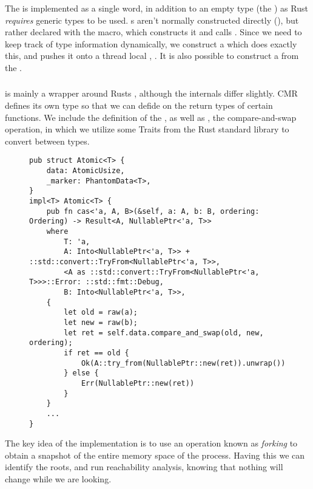 The  is implemented as a single word, in addition to an empty type (the
) as Rust \emph{requires} generic types to be used. s aren't normally
constructed directly (), but rather declared with the
 macro, which constructs it and calls . Since we need to keep
track of type information dynamically, we construct a  which does exactly this,
and pushes it onto a thread local , .
It is also possible to construct a  from the .

\subsubsection{}

 is mainly a wrapper around Rusts , although the internals differ
slightly. CMR defines its own type so that we can defide on the return types of certain functions.
We include the definition of the , as well as , the compare-and-swap
operation, in which we utilize some Traits from the Rust standard library to convert between types.

\begin{figure}[p]
  \begin{lstlisting}[caption=Excerpt of \mc{Atomic}s definitions]
pub struct Atomic<T> {
    data: AtomicUsize,
    _marker: PhantomData<T>,
}
impl<T> Atomic<T> {
    pub fn cas<'a, A, B>(&self, a: A, b: B, ordering: Ordering) -> Result<A, NullablePtr<'a, T>>
    where
        T: 'a,
        A: Into<NullablePtr<'a, T>> + ::std::convert::TryFrom<NullablePtr<'a, T>>,
        <A as ::std::convert::TryFrom<NullablePtr<'a, T>>>::Error: ::std::fmt::Debug,
        B: Into<NullablePtr<'a, T>>,
    {
        let old = raw(a);
        let new = raw(b);
        let ret = self.data.compare_and_swap(old, new, ordering);
        if ret == old {
            Ok(A::try_from(NullablePtr::new(ret)).unwrap())
        } else {
            Err(NullablePtr::new(ret))
        }
    }
    ...
}

\end{lstlisting}
\end{figure}

\clearpage
\vspace{2cm}


The key idea of the implementation is to use an operation known as \emph{forking} to obtain a
snapshot of the entire memory space of the process. Having this we can identify the roots, and run
reachability analysis, knowing that nothing will change while we are looking.

